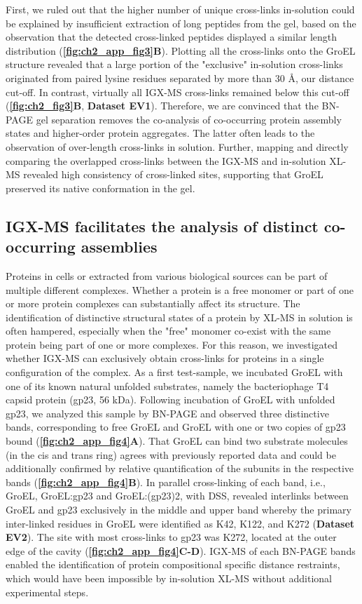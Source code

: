 First, we ruled out that the higher number of unique cross-links in-solution could be explained by insufficient extraction of long peptides from the gel, based on the observation that the detected cross-linked peptides displayed a similar length distribution (\textbf{\autoref{fig:ch2_app_fig3}B}). Plotting all the cross-links onto the GroEL structure revealed that a large portion of the "exclusive" in-solution cross-links originated from paired lysine residues separated by more than 30 Å, our distance cut-off. In contrast, virtually all IGX-MS cross-links remained below this cut-off (\textbf{\autoref{fig:ch2_fig3}B}, \textbf{Dataset EV1}). Therefore, we are convinced that the BN-PAGE gel separation removes the co-analysis of co-occurring protein assembly states and higher-order protein aggregates. The latter often leads to the observation of over-length cross-links in solution. Further, mapping and directly comparing the overlapped cross-links between the IGX-MS and in-solution XL-MS revealed high consistency of cross-linked sites, supporting that GroEL preserved its native conformation in the gel.
%
\subsection*{IGX-MS facilitates the analysis of distinct co-occurring assemblies}
Proteins in cells or extracted from various biological sources can be part of multiple different complexes. Whether a protein is a free monomer or part of one or more protein complexes can substantially affect its structure. The identification of distinctive structural states of a protein by XL-MS in solution is often hampered, especially when the "free" monomer co-exist with the same protein being part of one or more complexes. For this reason, we investigated whether IGX-MS can exclusively obtain cross-links for proteins in a single configuration of the complex. As a first test-sample, we incubated GroEL with one of its known natural unfolded substrates, namely the bacteriophage T4 capsid protein (gp23, 56 kDa). Following incubation of GroEL with unfolded gp23, we analyzed this sample by BN-PAGE and observed three distinctive bands, corresponding to free GroEL and GroEL with one or two copies of gp23 bound (\textbf{\autoref{fig:ch2_app_fig4}A}). That GroEL can bind two substrate molecules (in the cis and trans ring) agrees with previously reported data \cite{van_Duijn_2006} and could be additionally confirmed by relative quantification of the subunits in the respective bands (\textbf{\autoref{fig:ch2_app_fig4}B}). In parallel cross-linking of each band, i.e., GroEL, GroEL:gp23 and GroEL:(gp23)2, with DSS, revealed interlinks between GroEL and gp23 exclusively in the middle and upper band whereby the primary inter-linked residues in GroEL were identified as K42, K122, and K272 (\textbf{Dataset EV2}). The site with most cross-links to gp23 was K272, located at the outer edge of the cavity (\textbf{\autoref{fig:ch2_app_fig4}C-D}). IGX-MS of each BN-PAGE bands enabled the identification of protein compositional specific distance restraints, which would have been impossible by in-solution XL-MS without additional experimental steps.

